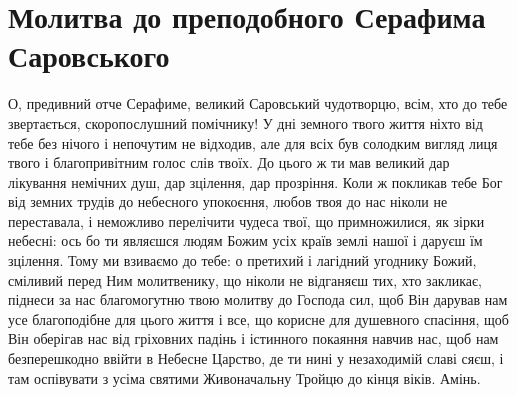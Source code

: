 \documentclass[chapters.tex]{subfiles}
\begin{document}
\section{Молитва до преподобного Серафима Саровського}
О, предивний отче Серафиме, великий Саровський чудотворцю, всім, хто до тебе звертається, скоропослушний помічнику! У дні земного твого життя ніхто від тебе без нічого і непочутим не відходив, але для всіх був солодким вигляд лиця твого і благопривітним голос слів твоїх. До цього ж ти мав великий дар лікування немічних душ, дар зцілення, дар прозріння. Коли ж покликав тебе Бог від земних трудів до небесного упокоєння, любов твоя до нас ніколи не переставала, і неможливо перелічити чудеса твої, що примножилися, як зірки небесні: ось бо ти являєшся людям Божим усіх країв землі нашої і даруєш їм зцілення. Тому ми взиваємо до тебе: о претихий і лагідний угоднику Божий, сміливий перед Ним молитвенику, що ніколи не відганяєш тих, хто закликає, піднеси за нас благомогутню твою молитву до Господа сил, щоб Він дарував нам усе благоподібне для цього життя і все, що корисне для душевного спасіння, щоб Він оберігав нас від гріховних падінь і істинного покаяння навчив нас, щоб нам безперешкодно ввійти в Небесне Царство, де ти нині у незаходимій славі сяєш, і там оспівувати з усіма святими Живоначальну Тройцю до кінця віків. Амінь.
\end{document}
